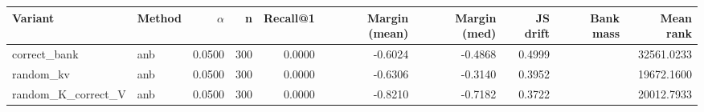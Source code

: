 \begin{tabular}{l l r r r r r r r r}
\toprule
Variant & Method & $\alpha$ & n & Recall@1 & Margin (mean) & Margin (med) & JS drift & Bank mass & Mean rank \\
\midrule
correct\_bank & anb & 0.0500 & 300 & 0.0000 & -0.6024 & -0.4868 & 0.4999 &  & 32561.0233 \\
random\_kv & anb & 0.0500 & 300 & 0.0000 & -0.6306 & -0.3140 & 0.3952 &  & 19672.1600 \\
random\_K\_correct\_V & anb & 0.0500 & 300 & 0.0000 & -0.8210 & -0.7182 & 0.3722 &  & 20012.7933 \\
\bottomrule
\end{tabular}
